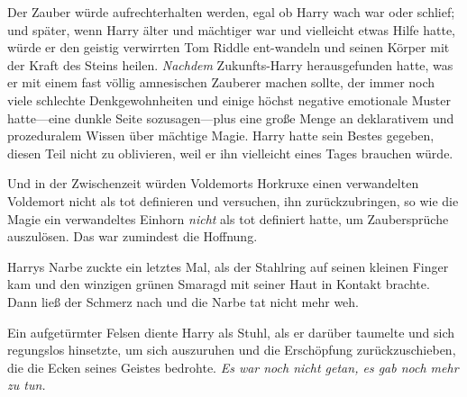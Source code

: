 Der Zauber würde aufrechterhalten werden, egal ob Harry wach war oder schlief; und später, wenn Harry älter und mächtiger war und vielleicht etwas Hilfe hatte, würde er den geistig verwirrten Tom Riddle ent-wandeln und seinen Körper mit der Kraft des Steins heilen. \emph{Nachdem} Zukunfts-Harry herausgefunden hatte, was er mit einem fast völlig amnesischen Zauberer machen sollte, der immer noch viele schlechte Denkgewohnheiten und einige höchst negative emotionale Muster hatte—eine dunkle Seite sozusagen—plus eine große Menge an deklarativem und prozeduralem Wissen über mächtige Magie. Harry hatte sein Bestes gegeben, diesen Teil nicht zu oblivieren, weil er ihn vielleicht eines Tages brauchen würde.

Und in der Zwischenzeit würden Voldemorts Horkruxe einen verwandelten Voldemort nicht als tot definieren und versuchen, ihn zurückzubringen, so wie die Magie ein verwandeltes Einhorn \emph{nicht} als tot definiert hatte, um Zaubersprüche auszulösen. Das war zumindest die Hoffnung.

Harrys Narbe zuckte ein letztes Mal, als der Stahlring auf seinen kleinen Finger kam und den winzigen grünen Smaragd mit seiner Haut in Kontakt brachte. Dann ließ der Schmerz nach und die Narbe tat nicht mehr weh.

Ein aufgetürmter Felsen diente Harry als Stuhl, als er darüber taumelte und sich regungslos hinsetzte, um sich auszuruhen und die Erschöpfung zurückzuschieben, die die Ecken seines Geistes bedrohte. \emph{Es war noch nicht getan, es gab noch mehr zu tun.}


